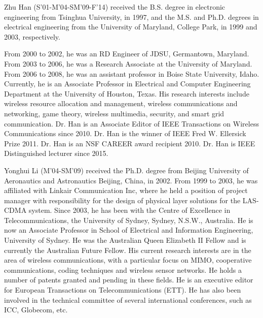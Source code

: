 \documentclass[onecolumn,12pt]{IEEEtran}
\begin{document}
\begin{biography}{Zhu Han}
(S'01-M'04-SM'09-F'14) received the B.S. degree in electronic engineering from Tsinghua University, in 1997, and the M.S. and Ph.D. degrees in electrical engineering from the University of Maryland, College Park, in 1999 and 2003, respectively.

From 2000 to 2002, he was an RD Engineer of JDSU, Germantown, Maryland. From 2003 to 2006, he was a Research Associate at the University of Maryland. From 2006 to 2008, he was an assistant professor in Boise State University, Idaho. Currently, he is an Associate Professor in Electrical and Computer Engineering Department at the University of Houston, Texas. His research interests include wireless resource allocation and management, wireless communications and networking, game theory, wireless multimedia, security, and smart grid communication. Dr. Han is an Associate Editor of IEEE Transactions on Wireless Communications since 2010. Dr. Han is the winner of IEEE Fred W. Ellersick Prize 2011. Dr. Han is an NSF CAREER award recipient 2010. Dr. Han is IEEE Distinguished lecturer since 2015.
\end{biography}

\begin{biography}{Yonghui Li}
(M'04-SM'09) received the Ph.D. degree from Beijing University of Aeronautics and Astronautics Beijing, China, in 2002. From 1999 to 2003, he was affiliated with Linkair Communication Inc, where he held a position of project manager with responsibility for the design of physical layer solutions for the LAS-CDMA system. Since 2003, he has been with the Centre of Excellence in Telecommunications, the University of Sydney, Sydney, N.S.W., Australia. He is now an Associate Professor in School of Electrical and Information Engineering, University of Sydney. He was the Australian Queen Elizabeth II Fellow and is currently the Australian Future Fellow. His current research interests are in the area of wireless communications, with a particular focus on MIMO, cooperative communications, coding techniques and wireless sensor networks. He holds a number of patents granted and pending in these fields. He is an executive editor for European Transactions on Telecommunications (ETT). He has also been involved in the technical committee of several international conferences, such as ICC, Globecom, etc.
\end{biography}
\end{document}
